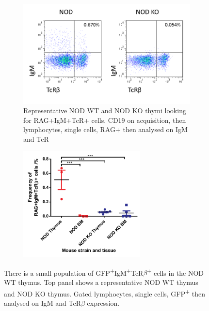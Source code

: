 \begin{figure}
	\begin{subfigure}{\textwidth}
	\includegraphics[width=\textwidth]{Figures/NODKOIgMTcR.png}
	\caption{Representative NOD WT and NOD KO thymi looking for RAG+IgM+TcR+ cells. CD19 on acquisition, then lymphocytes, single cells, RAG+ then analysed on IgM and TcR}
	\label{subfig:BMvThyRAGIgMTcR}
	\end{subfigure}
	\begin{subfigure}{\textwidth}
	\centering
	\includegraphics[width=0.7\textwidth]{Figures/IgMTcR.pdf}
	\caption{}
	\label{subfig:IgMTcRposgraph}
	\end{subfigure}
\caption[There is a very small population of IgM\textsuperscript{+}TcR$\beta$\textsuperscript{+} cells in the NOD thymus]{There is a small population of GFP\textsuperscript{+}IgM\textsuperscript{+}TcR$\beta$\textsuperscript{+} cells in the NOD WT thymus. 
Top panel shows a representative NOD WT thymus and NOD KO thymus.
Gated lymphocytes, single cells, GFP\textsuperscript{+} then analysed on IgM and TcR$\beta$ expression.
}
\end{figure}
